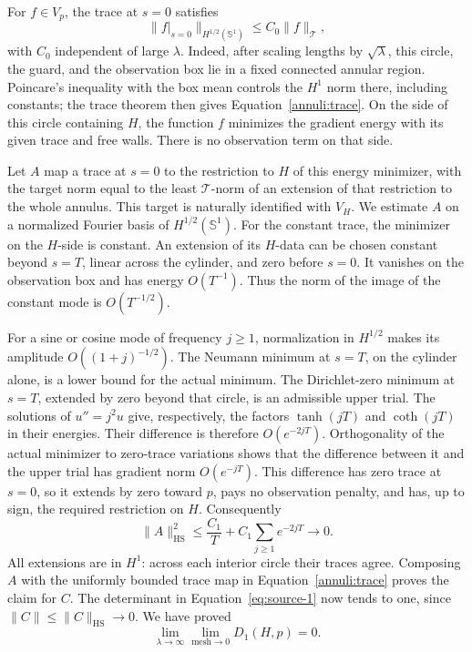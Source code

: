 For \(f\in V_p\), the trace at \(s=0\) satisfies
\begin{equation}\label{annuli:trace}
 \|f|_{s=0}\|_{H^{1/2}(\mathbb S^1)}
       \le C_0\|f\|_{\mathcal T},
\end{equation}
with \(C_0\) independent of large \(\lambda\). Indeed, after scaling
lengths by \(\sqrt\lambda\), this circle, the guard, and the observation
box lie in a fixed connected annular region. Poincare's inequality
with the box mean controls the \(H^1\) norm there, including constants;
the trace theorem then gives Equation~\eqref{annuli:trace}.
On the side of this circle containing \(H\), the function \(f\)
minimizes the gradient energy with its given trace and free walls.
There is no observation term on that side.

Let \(A\) map a trace at \(s=0\) to the restriction to \(H\) of this
energy minimizer, with the target norm equal to the least
\(\mathcal T\)-norm of an extension of that restriction to the whole
annulus. This target is naturally identified with \(V_H\).
We estimate \(A\) on a normalized Fourier basis of \(H^{1/2}(\mathbb S^1)\).
For the constant trace, the minimizer on the \(H\)-side is constant.
An extension of its \(H\)-data can be chosen constant beyond \(s=T\),
linear across the cylinder, and zero before \(s=0\). It vanishes on
the observation box and has energy \(O(T^{-1})\). Thus the norm of
the image of the constant mode is \(O(T^{-1/2})\).

For a sine or cosine mode of frequency \(j\ge1\), normalization in
\(H^{1/2}\) makes its amplitude \(O((1+j)^{-1/2})\).
The Neumann minimum at \(s=T\), on the cylinder alone, is a lower
bound for the actual minimum. The Dirichlet-zero minimum at \(s=T\),
extended by zero beyond that circle, is an admissible upper trial.
The solutions of \(u''=j^2u\) give, respectively, the factors
\(\tanh(jT)\) and \(\coth(jT)\) in their energies. Their difference
is therefore \(O(e^{-2jT})\). Orthogonality of the actual minimizer
to zero-trace variations shows that the difference between it and
the upper trial has gradient norm \(O(e^{-jT})\). This difference
has zero trace at \(s=0\), so it extends by zero toward \(p\), pays no
observation penalty, and has, up to sign, the required restriction
on \(H\). Consequently
\[
 \|A\|_{\mathrm{HS}}^2
       \le \frac{C_1}{T}+C_1\sum_{j\ge1}e^{-2jT}
       \longrightarrow0.
\]
All extensions are in \(H^1\): across each interior circle their
traces agree. Composing \(A\) with the uniformly bounded trace map
in Equation~\eqref{annuli:trace} proves the claim for \(C\).
The determinant in Equation~\eqref{eq:source-1} now tends to one,
since \(\|C\|\le\|C\|_{\mathrm{HS}}\to0\). We have proved
\begin{equation}\label{annuli:unit-confinement}
 \lim_{\lambda\to\infty}\lim_{\mathrm{mesh}\to0}D_1(H,p)=0.
\end{equation}

